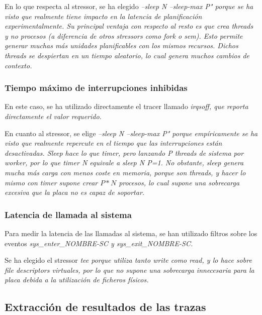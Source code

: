 \documentclass[../main.tex]{subfiles}
\begin{document}
En lo que respecta al stressor, se ha elegido \it{--sleep N --sleep-max P"} porque se ha visto que realmente tiene impacto en la latencia de planificación experimentalmente. Su principal ventaja con respecto al resto es que crea threads y no procesos (a diferencia de otros stressors como \it{fork} o \it{sem}). Esto permite generar muchas más unidades planificables con los mismos recursos. Dichos threads se despiertan en un tiempo aleatorio, lo cual genera muchos cambios de contexto.

\subsubsection{Tiempo máximo de interrupciones inhibidas}

En este caso, se ha utilizado directamente el tracer llamado \it{irqsoff}, que reporta directamente el valor requerido.

En cuanto al stressor, se elige \it{--sleep N --sleep-max P"} porque empíricamente se ha visto que realmente repercute en el tiempo que las interrupciones están desactivadas. \it{Sleep} hace lo que \it{timer}, pero lanzando P threads de sistema por worker, por lo que \it{timer N} equivale a \it{sleep N P=1}. No obstante, \it{sleep} genera mucha más carga con menos coste en memoria, porque son threads, y hacer lo mismo con \it{timer} supone crear $P*N$ procesos, lo cual supone una sobrecarga excesiva que la placa no es capaz de soportar.

\subsubsection{Latencia de llamada al sistema}

Para medir la latencia de las llamadas al sistema, se han utilizado filtros sobre los eventos \it{sys\_enter\_NOMBRE-SC} y \it{sys\_exit\_NOMBRE-SC}.

Se ha elegido el stressor \it{tee} porque utiliza tanto \it{write} como \it{read}, y lo hace sobre \it{file descriptors} virtuales, por lo que no supone una sobrecarga innecesaria para la placa debida a la utilización de ficheros físicos.

\subsection{Extracción de resultados de las trazas}
\end{document}
